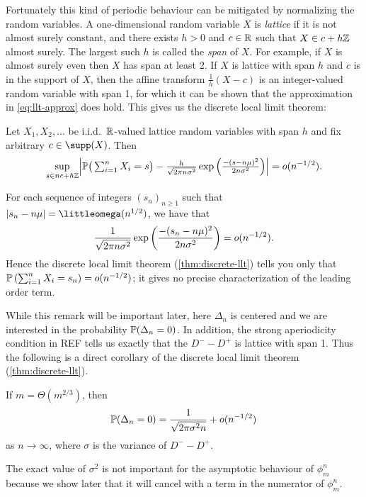 Fortunately this kind of periodic behaviour can be mitigated by normalizing the random variables. A one-dimensional random variable $X$ is \emph{lattice} if it is not almost surely constant, and there exists $h > 0$ and $c \in \R$ such that $X \in c + h\Z$ almost surely. The largest such $h$ is called the \emph{span} of $X$. For example, if $X$ is almost surely even then $X$ has span at least 2. If $X$ is lattice with span $h$ and $c$ is in the support of $X$, then the affine transform $\frac{1}{h}(X - c)$ is an integer-valued random variable with span 1, for which it can be shown that the approximation in \cref{eq:llt-approx} does hold. This gives us the discrete local limit theorem:
\begin{theorem}
    \label{thm:discrete-llt}
    Let $X_1, X_2, \ldots$ be i.i.d.\ $\R$-valued lattice random variables with span $h$ and fix arbitrary $c \in \supp(X)$. Then
    \begin{equation*}
        \sup_{s \in n c + h \Z} \abs*{
            \P\big( \textstyle \sum_{i=1}^n X_i = s \big) 
            -
            \frac{h}{\sqrt{2 \pi n \sigma^2}}  \exp \left(
                \frac{-(s - n \mu)^2}{2 n \sigma^2}
            \right)
        } = \littleo(n^{-1/2}).
    \end{equation*}
\end{theorem}

\begin{remark}
    \label{rem:llt-limitations}
    For each sequence of integers $(s_n)_{n \geq 1}$ such that $\abs{s_n - n \mu} = \littleomega(n^{1/2})$, we have that
    \begin{equation*}
        \frac{1}{\sqrt{2 \pi n \sigma^2}}  \exp \left(
            \frac{-(s_n - n \mu)^2}{2 n \sigma^2}
        \right)
        = \littleo(n^{-1/2}).
    \end{equation*}
    Hence the discrete local limit theorem (\cref{thm:discrete-llt}) tells you only that $\P\left(\sum_{i=1}^n X_i = s_n\right) = \littleo(n^{-1/2})$; it gives no precise characterization of the leading order term.
\end{remark}

While this remark will be important later, here $\Delta_n$ is centered and we are interested in the probability $\P(\Delta_n = 0)$. In addition, the strong aperiodicity condition in REF tells us exactly that the $D^- - D^+$ is lattice with span 1. Thus the following is a direct corollary of the discrete local limit theorem (\cref{thm:discrete-llt}).
\begin{corollary}
    \label{cor:measure-change-denominator-control}
    If $m = \Theta(m^{2/3})$, then
    \begin{equation*}
        \P(\Delta_n = 0) = \frac{1}{\sqrt{2 \pi \sigma^2 n}} + \littleo(n^{-1/2})
    \end{equation*}
    as $n \to \infty$, where $\sigma$ is the variance of $D^- - D^+$.
\end{corollary}
\begin{remark}
    The exact value of $\sigma^2$ is not important for the asymptotic behaviour of $\phi^n_m$ because we show later that it will cancel with a term in the numerator of $\phi^n_m$.
\end{remark}


